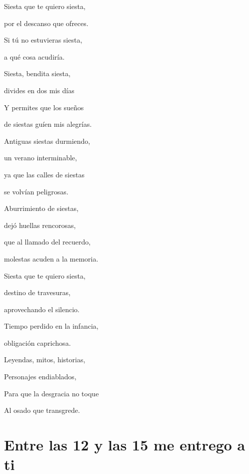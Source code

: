 \documentclass[11pt,twoside,openright,a5paper]{book}
\begin{document}
\begin{center}

Siesta que te quiero siesta,

por el descanso que ofreces.

Si tú no estuvieras siesta,

a qué cosa acudiría.

\vspace{0.5cm}

Siesta, bendita siesta,

divides en dos mis días

Y permites que los sueños

de siestas guíen mis alegrías.

\vspace{0.5cm}

Antiguas siestas durmiendo,

un verano interminable,

ya que las calles de siestas

se volvían peligrosas.

\vspace{0.5cm}

Aburrimiento de siestas,

dejó huellas rencorosas,

que  al llamado del recuerdo,

molestas acuden a la memoria.

\vspace{0.5cm}

Siesta que te quiero siesta,

destino de travesuras,

aprovechando el silencio.

Tiempo perdido en la infancia,

obligación caprichosa.

\vspace{0.5cm}

Leyendas, mitos, historias,

Personajes endiablados,

Para que la desgracia no toque

Al osado que transgrede.
\end{center}

\section*{Entre las 12 y las 15 me entrego a ti}
\end{document}
